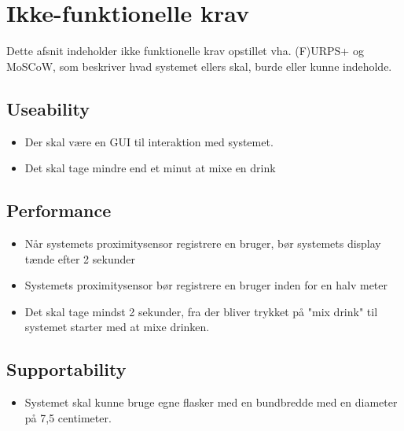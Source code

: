 \section{Ikke-funktionelle krav}
Dette afsnit indeholder ikke funktionelle krav opstillet vha. (F)URPS+ og MoSCoW, som beskriver hvad systemet ellers skal, burde eller kunne indeholde. 

\subsection{Useability}
\begin{itemize}
    \item Der skal være en GUI til interaktion med systemet. 
    \item Det skal tage mindre end et minut at mixe en drink
\end{itemize}

\subsection{Performance}
\begin{itemize}
    \item Når systemets proximitysensor registrere en bruger, bør systemets display tænde efter 2 sekunder
    \item Systemets proximitysensor bør registrere en bruger inden for en halv meter
    \item Det skal tage mindst 2 sekunder, fra der bliver trykket på "mix drink" til systemet starter med at mixe drinken.
\end{itemize}

\subsection{Supportability}
\begin{itemize}
    \item Systemet skal kunne bruge egne flasker med en bundbredde med en diameter på 7,5 centimeter.
\end{itemize}